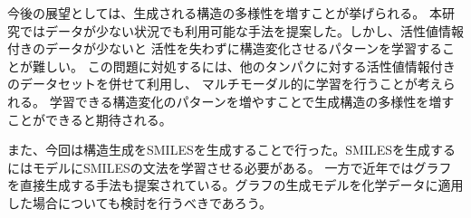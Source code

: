 今後の展望としては、生成される構造の多様性を増すことが挙げられる。
本研究ではデータが少ない状況でも利用可能な手法を提案した。しかし、活性値情報付きのデータが少ないと
活性を失わずに構造変化させるパターンを学習することが難しい。
この問題に対処するには、他のタンパクに対する活性値情報付きのデータセットを併せて利用し、
マルチモーダル的に学習を行うことが考えられる。
学習できる構造変化のパターンを増やすことで生成構造の多様性を増すことができると期待される。

また、今回は構造生成をSMILESを生成することで行った。SMILESを生成するにはモデルにSMILESの文法を学習させる必要がある。
一方で近年ではグラフを直接生成する手法も提案されている。グラフの生成モデルを化学データに適用した場合についても検討を行うべきであろう。